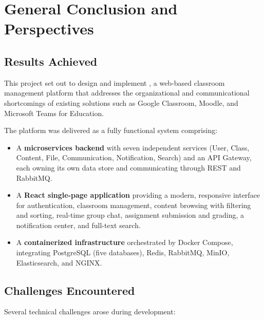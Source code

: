 \chapter*{General Conclusion and Perspectives}

\section*{Results Achieved}

This project set out to design and implement \eduspace{}, a web-based classroom management platform that addresses the organizational and communicational shortcomings of existing solutions such as Google Classroom, Moodle, and Microsoft Teams for Education.

The platform was delivered as a fully functional system comprising:

\begin{itemize}[nosep]
  \item A \textbf{microservices backend} with seven independent services (User, Class, Content, File, Communication, Notification, Search) and an API Gateway, each owning its own data store and communicating through REST and RabbitMQ.
  \item A \textbf{React single-page application} providing a modern, responsive interface for authentication, classroom management, content browsing with filtering and sorting, real-time group chat, assignment submission and grading, a notification center, and full-text search.
  \item A \textbf{containerized infrastructure} orchestrated by Docker Compose, integrating PostgreSQL (five databases), Redis, RabbitMQ, MinIO, Elasticsearch, and NGINX.
\end{itemize}

\section*{Challenges Encountered}

Several technical challenges arose during development:


